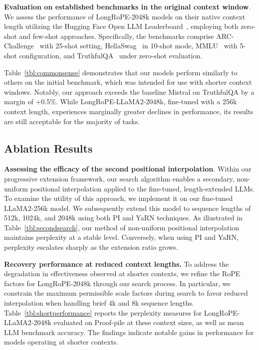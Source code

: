 \textbf{Evaluation on established benchmarks in the original context window}. We assess the performance of LongRoPE-2048k models on their native context length utilizing the Hugging Face Open LLM Leaderboard~\cite{huggingfaceboard}, employing both zero-shot and few-shot approaches. Specifically, the benchmarks comprise ARC-Challenge~\cite{allenai:arc} with 25-shot setting, HellaSwag~\cite{zellers2019hellaswag} in 10-shot mode, MMLU~\cite{mmlu} with 5-shot configuration, and TruthfulQA~\cite{lin2021truthfulqa} under zero-shot evaluation.

Table~\ref{tbl:commonsense} demonstrates that our models perform similarly to others on the initial benchmark, which was intended for use with shorter context windows. Notably, our approach exceeds the baseline Mistral on TruthfulQA by a margin of +0.5\%. While LongRoPE-LLaMA2-2048k, fine-tuned with a 256k context length, experiences marginally greater declines in performance, its results are still acceptable for the majority of tasks.

\subsection{Ablation Results}

\textbf{Assessing the efficacy of the second positional interpolation}. Within our progressive extension framework, our search algorithm enables a secondary, non-uniform positional interpolation applied to the fine-tuned, length-extended LLMs. To examine the utility of this approach, we implement it on our fine-tuned LLaMA2-256k model. We subsequently extend this model to sequence lengths of 512k, 1024k, and 2048k using both PI and YaRN techniques. As illustrated in Table~\ref{tbl:secondsearch}, our method of non-uniform positional interpolation maintains perplexity at a stable level. Conversely, when using PI and YaRN, perplexity escalates sharply as the extension ratio grows.

\textbf{Recovery performance at reduced context lengths.} To address the degradation in effectiveness observed at shorter contexts, we refine the RoPE factors for LongRoPE-2048k through our search process. In particular, we constrain the maximum permissible scale factors during search to favor reduced interpolation when handling brief 4k and 8k sequence lengths. Table~\ref{tbl:shortperformance} reports the perplexity measures for LongRoPE-LLaMA2-2048k evaluated on Proof-pile at these context sizes, as well as mean LLM benchmark accuracy. The findings indicate notable gains in performance for models operating at shorter contexts.

